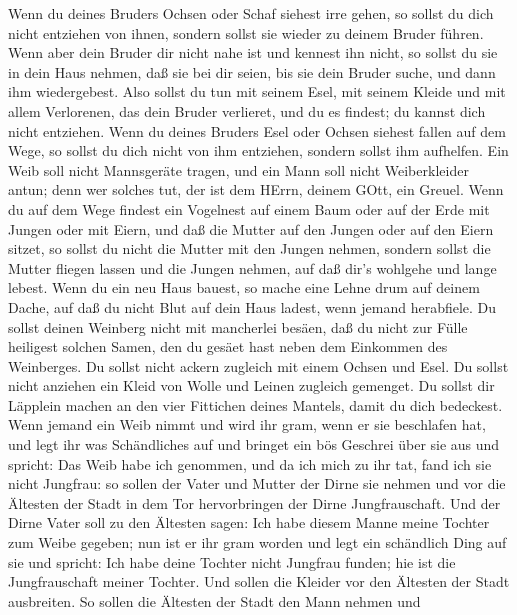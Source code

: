  Wenn du deines Bruders Ochsen oder Schaf siehest irre
gehen, so sollst du dich nicht entziehen von ihnen, sondern sollst sie
wieder zu deinem Bruder führen.  Wenn aber dein Bruder dir
nicht nahe ist und kennest ihn nicht, so sollst du sie in dein Haus
nehmen, daß sie bei dir seien, bis sie dein Bruder suche, und dann ihm
wiedergebest.  Also sollst du tun mit seinem Esel, mit
seinem Kleide und mit allem Verlorenen, das dein Bruder verlieret, und
du es findest; du kannst dich nicht entziehen.  Wenn du
deines Bruders Esel oder Ochsen siehest fallen auf dem Wege, so sollst
du dich nicht von ihm entziehen, sondern sollst ihm aufhelfen.
 Ein Weib soll nicht Mannsgeräte tragen, und ein Mann soll
nicht Weiberkleider antun; denn wer solches tut, der ist dem HErrn,
deinem GOtt, ein Greuel.  Wenn du auf dem Wege findest ein
Vogelnest auf einem Baum oder auf der Erde mit Jungen oder mit Eiern,
und daß die Mutter auf den Jungen oder auf den Eiern sitzet, so sollst
du nicht die Mutter mit den Jungen nehmen,  sondern sollst
die Mutter fliegen lassen und die Jungen nehmen, auf daß dir's wohlgehe
und lange lebest.  Wenn du ein neu Haus bauest, so mache
eine Lehne drum auf deinem Dache, auf daß du nicht Blut auf dein Haus
ladest, wenn jemand herabfiele.  Du sollst deinen Weinberg
nicht mit mancherlei besäen, daß du nicht zur Fülle heiligest solchen
Samen, den du gesäet hast neben dem Einkommen des Weinberges.
 Du sollst nicht ackern zugleich mit einem Ochsen und Esel.
 Du sollst nicht anziehen ein Kleid von Wolle und Leinen
zugleich gemenget.  Du sollst dir Läpplein machen an den
vier Fittichen deines Mantels, damit du dich bedeckest. 
Wenn jemand ein Weib nimmt und wird ihr gram, wenn er sie beschlafen
hat,  und legt ihr was Schändliches auf und bringet ein bös
Geschrei über sie aus und spricht: Das Weib habe ich genommen, und da
ich mich zu ihr tat, fand ich sie nicht Jungfrau:  so
sollen der Vater und Mutter der Dirne sie nehmen und vor die Ältesten
der Stadt in dem Tor hervorbringen der Dirne Jungfrauschaft.
 Und der Dirne Vater soll zu den Ältesten sagen: Ich habe
diesem Manne meine Tochter zum Weibe gegeben; nun ist er ihr gram worden
 und legt ein schändlich Ding auf sie und spricht: Ich habe
deine Tochter nicht Jungfrau funden; hie ist die Jungfrauschaft meiner
Tochter. Und sollen die Kleider vor den Ältesten der Stadt ausbreiten.
 So sollen die Ältesten der Stadt den Mann nehmen und
